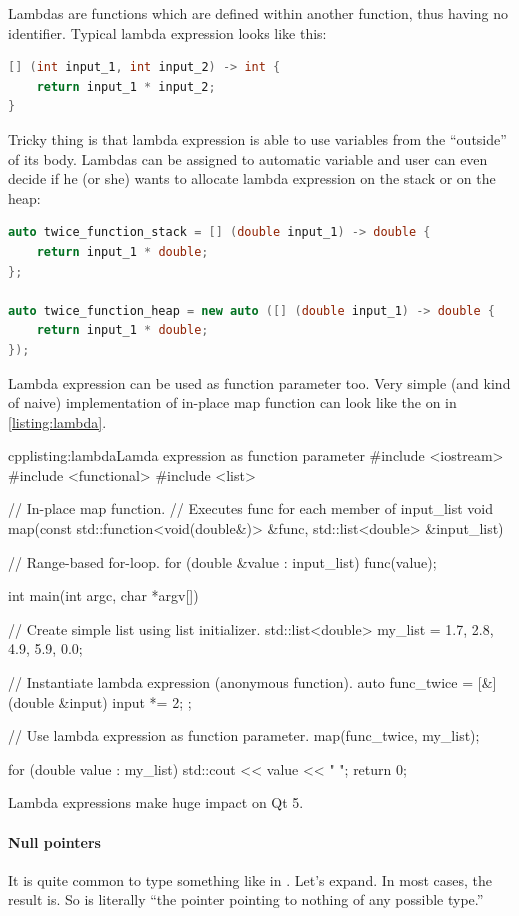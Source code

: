 Lambdas are functions which are defined within another function, thus having no identifier. Typical lambda expression looks like this:
\begin{lstlisting}[firstnumber=1,language=cpp]
[] (int input_1, int input_2) -> int {
	return input_1 * input_2;
}
\end{lstlisting}
Tricky thing is that lambda expression is able to use variables from the \enquote{outside} of its body. Lambdas can be assigned to automatic variable and user can even decide if he (or she) wants to allocate lambda expression on the stack or on the heap:
\begin{lstlisting}[firstnumber=1,language=cpp]
auto twice_function_stack = [] (double input_1) -> double {
	return input_1 * double;
};

auto twice_function_heap = new auto ([] (double input_1) -> double {
	return input_1 * double;
});
\end{lstlisting}
Lambda expression can be used as function parameter too. Very simple (and kind of naive) implementation of in-place map function can look like the on in \autoref{listing:lambda}.
\begin{fdoccode}{cpp}{listing:lambda}{Lamda expression as function parameter}
#include <iostream>
#include <functional>
#include <list>


// In-place map function.
// Executes func for each member of input_list
void map(const std::function<void(double&)> &func, std::list<double> &input_list) {

    // Range-based for-loop.
    for (double &value : input_list) {
		func(value);
    }
}

int main(int argc, char *argv[]) {
    // Create simple list using list initializer.
    std::list<double> my_list = {1.7, 2.8, 4.9, 5.9, 0.0};

    // Instantiate lambda expression (anonymous function).
    auto func_twice = [&] (double &input) {
		input *= 2;
    };

    // Use lambda expression as function parameter.
    map(func_twice, my_list);

    for (double value : my_list) {
		std::cout << value << " ";
    }
    return 0;
}
\end{fdoccode}
Lambda expressions make huge impact on Qt 5.

\paragraph*{Null pointers}
It is quite common to type something like in . Let's expand. In most cases, the result is. So is literally \enquote{the pointer pointing to nothing of any possible type.}

